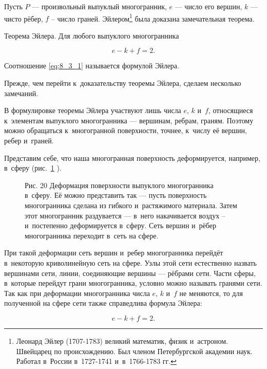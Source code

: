 

Пусть $P$ --- произвольный выпуклый многогранник, $e$ --- число его вершин,
$k$ --- чисто рёбер, $f$ -- число граней.
Эйлером\footnote{Леонард Эйлер (1707-1783) великий математик, физик и~астроном.
Швейцарец по происхождению. Был членом Петербургской академии наук. Работал
в~России в~1727-1741 и~в~1766-1783 гг.}
была доказана замечательная теорема.

\begin{Th}
Теорема Эйлера. Для любого выпуклого многогранника

\begin{equation}\label{eq:8_3_1}
e - k + f = 2.
\end{equation}

Соотношение \ref{eq:8_3_1} называется формулой Эйлера.
\end{Th}

Прежде, чем перейти к~доказательству теоремы Эйлера, сделаем несколько замечаний.

В формулировке теоремы Эйлера участвуют лишь числа $e$, $k$ и~$f$, относящиеся
к~элементам выпуклого многогранника --- вершинам, ребрам, граням.
Поэтому можно обращаться к~многогранной поверхности, точнее, к~числу её вершин,
ребер и~граней.

Представим себе, что наша многогранная поверхность деформируется, например,
в~сферу (рис.\ \ref{fig:8_3_20} ).

\begin{figure}\label{fig:8_3_20}
\caption{Рис. 20 Деформация поверхности выпуклого многогранника в~сферу.
Её можно представить так --- пусть поверхность многогранника сделана из гибкого
и~растяжимого материала. Затем этот многогранник раздувается --- в~него
накачивается воздух -- и~постепенно деформируется в~сферу. Сеть вершин и~рёбер
многогранника переходит в~сеть на сфере.}
\end{figure}


При такой деформации сеть вершин и~ребер многогранника перейдёт в~некоторую
криволинейную сеть на сфере. Узлы этой сети естественно назвать вершинами сети,
линии, соединяющие вершины --- рёбрами сети. Части сферы, в~которые перейдут
грани многогранника, условно можно называть гранями сети. Так как при
деформации многогранника числа $e$, $k$ и~$f$ не меняются, то для полученной
на сфере сети также справедлива формула Эйлера:

\begin{equation*}
e - k +f = 2.
\end{equation*}

